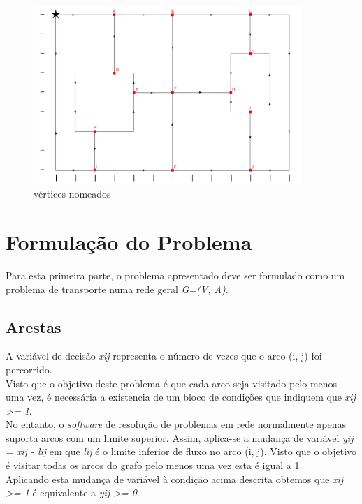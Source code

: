 \documentclass[a4paper]{report}
\begin{document}
\begin{figure}[H]
    \begin{center}
        \includegraphics[width=0.9\textwidth]{images/desafioLetras.png}\par
        \caption{vértices nomeados}
        \label{fig:named}
    \end{center}
\end{figure}

\pagebreak
\section{Formulação do Problema}
Para esta primeira parte, o problema apresentado deve ser formulado como um
problema de transporte numa rede geral \textit{G=(V, A)}.

\subsection{Arestas}
A variável de decisão \textit{xij} representa o número de vezes que o arco (i,
j) foi percorrido.\\
Visto que o objetivo deste problema é que cada arco seja visitado pelo menos
uma vez, é necessária a existencia de um bloco de condições que indiquem que
\textit{xij >= 1}.\\
No entanto, o \textit{software} de resolução de problemas em rede normalmente
apenas suporta arcos com um limite superior. Assim, aplica-se a mudança de
variável \textit{yij = xij - lij} em que \textit{lij} é o limite inferior de
fluxo no arco (i, j). Visto que o objetivo é visitar todas os arcos do grafo
pelo menos uma vez esta é igual a 1.\\
Aplicando esta mudança de variável à condição acima descrita obtemos que
\textit{xij >= 1} é equivalente a \textit{yij >= 0}.
\end{document}
